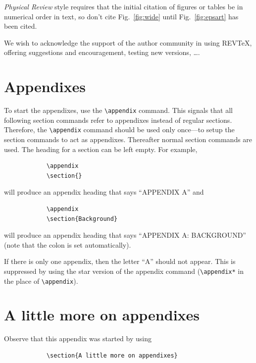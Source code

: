 \documentclass[%
reprint,
amsmath,amssymb,
aps,
]{revtex4-2}
\begin{document}
		\textit{Physical Review} style requires that the initial citation of
		figures or tables be in numerical order in text, so don't cite
		Fig.~\ref{fig:wide} until Fig.~\ref{fig:epsart} has been cited.
		
		\begin{acknowledgments}
			We wish to acknowledge the support of the author community in using
			REV\TeX{}, offering suggestions and encouragement, testing new versions,
			\dots.
		\end{acknowledgments}
		
		\appendix
		
		\section{Appendixes}
		
		To start the appendixes, use the \verb+\appendix+ command.
		This signals that all following section commands refer to appendixes
		instead of regular sections. Therefore, the \verb+\appendix+ command
		should be used only once---to setup the section commands to act as
		appendixes. Thereafter normal section commands are used. The heading
		for a section can be left empty. For example,
		\begin{verbatim}
			\appendix
			\section{}
		\end{verbatim}
		will produce an appendix heading that says ``APPENDIX A'' and
		\begin{verbatim}
			\appendix
			\section{Background}
		\end{verbatim}
		will produce an appendix heading that says ``APPENDIX A: BACKGROUND''
		(note that the colon is set automatically).
		
		If there is only one appendix, then the letter ``A'' should not
		appear. This is suppressed by using the star version of the appendix
		command (\verb+\appendix*+ in the place of \verb+\appendix+).
		
		\section{A little more on appendixes}
		
		Observe that this appendix was started by using
		\begin{verbatim}
			\section{A little more on appendixes}
		\end{verbatim}
		
\end{document}
